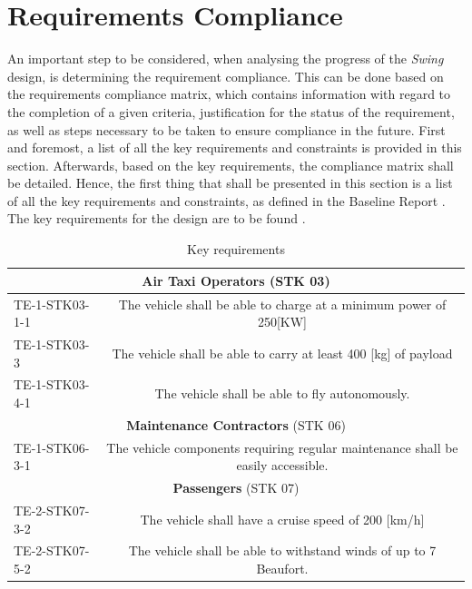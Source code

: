 \chapter{Requirements Compliance}
\label{ch:Requirements_Compliance}
An important step to be considered, when analysing the progress of the \textit{Swing} design, is determining the requirement compliance.
This can be done based on the requirements compliance matrix, which contains information with regard to the completion of a given criteria, justification for the status of the requirement, as well as steps necessary to be taken to ensure compliance in the future.
First and foremost, a list of all the key requirements and constraints is provided in this section.
Afterwards, based on the key requirements, the compliance matrix shall be detailed.
Hence, the first thing that shall be presented in this section is a list of all the key requirements and constraints, as defined in the Baseline Report \cite{baselinerepo}.
The key requirements for the design are to be found .

\begin{table}[H]
\centering
\caption{Key requirements}
\begin{tabular}{l|c}
\toprule
\multicolumn{2}{c}{\textbf{Air Taxi Operators} (STK 03)}                                                   \\ \midrule
TE-1-STK03-1-1 & The vehicle shall be able to charge at a minimum power of 250{[}KW{]}             \\
TE-1-STK03-3   & The vehicle shall be able to carry at least 400 [kg] of payload               \\
TE-1-STK03-4-1 & The vehicle shall be able to fly autonomously.                                   \\ \midrule
\multicolumn{2}{c}{\textbf{Maintenance Contractors} (STK 06)}                                              \\ \midrule
TE-1-STK06-3-1 & The vehicle components requiring regular maintenance shall be easily accessible. \\ \midrule
\multicolumn{2}{c}{\textbf{Passengers} (STK 07)}                                                           \\ \midrule
TE-2-STK07-3-2 & The vehicle shall have a cruise speed of 200 {[}km/h{]}                          \\
TE-2-STK07-5-2 & The vehicle shall be able to withstand winds of up to 7 Beaufort.               \\
    \bottomrule
\end{tabular}
\end{table}

